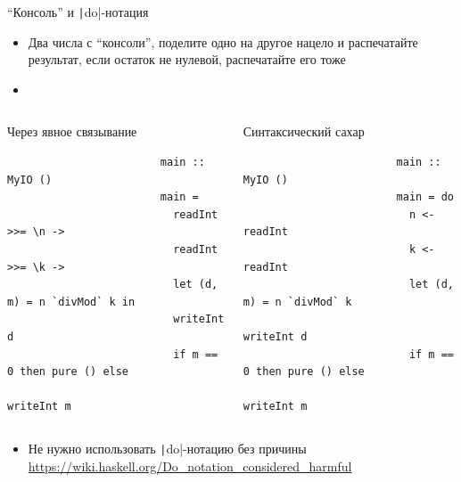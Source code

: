     \begin{frame}[fragile]{``Консоль'' и \texttt|do|-нотация}
        \begin{itemize}
            \item[\todo] Два числа с ``консоли'', поделите одно на другое нацело и распечатайте результат, если остаток не нулевой, распечатайте его тоже
            \item[\answer] \pause
        \end{itemize}
        \vspace{-1.7em}
        \begin{columns}[onlytextwidth]
            \begin{column}[t]{0.485\textwidth}
                \pause
                \begin{block}{Через явное связывание}
                    \begin{verbatim}
                        main :: MyIO ()
                        main =
                          readInt >>= \n ->
                          readInt >>= \k ->
                          let (d, m) = n `divMod` k in
                          writeInt d
                          if m == 0 then pure () else
                            writeInt m
                    \end{verbatim}
                \end{block}
            \end{column}\hfill%
            \begin{column}[t]{0.485\textwidth}
                \pause
                \begin{block}{Синтаксический сахар}
                    \begin{verbatim}
                        main :: MyIO ()
                        main = do
                          n <- readInt
                          k <- readInt
                          let (d, m) = n `divMod` k
                          writeInt d
                          if m == 0 then pure () else
                            writeInt m
                    \end{verbatim}
                \end{block}
            \end{column}
        \end{columns}
        \vspace{0.5em}
        \begin{itemize}
            \item Не нужно использовать \texttt|do|-нотацию без причины\\ {\color{blue} \url{https://wiki.haskell.org/Do_notation_considered_harmful}}
        \end{itemize}
    \end{frame}

